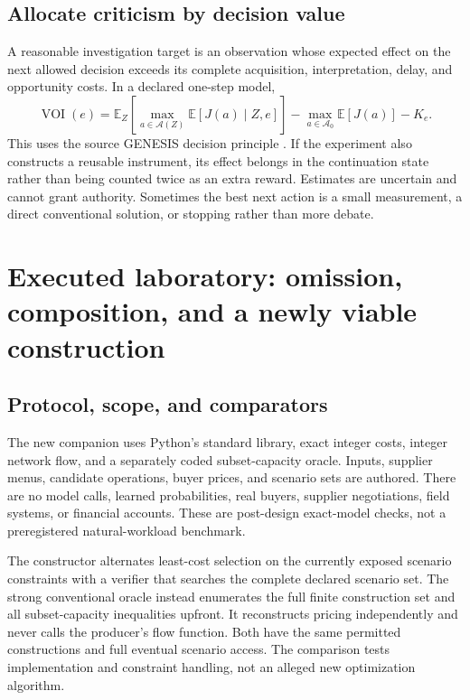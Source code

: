 \documentclass[11pt,a4paper]{article}
\newcommand{\E}{\mathbb{E}}
\begin{document}
\subsection{Allocate criticism by decision value}
A reasonable investigation target is an observation whose expected effect on the next allowed decision exceeds its complete acquisition, interpretation, delay, and opportunity costs. In a declared one-step model,
\begin{equation}
\operatorname{VOI}(e)=\E_Z\!\left[\max_{a\in\mathcal A(Z)}\E[J(a)\mid Z,e]\right]-\max_{a\in\mathcal A_0}\E[J(a)]-K_e.\label{eq:voi}
\end{equation}
This uses the source GENESIS decision principle \cite[Sec.~6.2]{genesis}. If the experiment also constructs a reusable instrument, its effect belongs in the continuation state rather than being counted twice as an extra reward. Estimates are uncertain and cannot grant authority. Sometimes the best next action is a small measurement, a direct conventional solution, or stopping rather than more debate.

\section{Executed laboratory: omission, composition, and a newly viable construction}
\subsection{Protocol, scope, and comparators}
The new companion uses Python's standard library, exact integer costs, integer network flow, and a separately coded subset-capacity oracle. Inputs, supplier menus, candidate operations, buyer prices, and scenario sets are authored. There are no model calls, learned probabilities, real buyers, supplier negotiations, field systems, or financial accounts. These are post-design exact-model checks, not a preregistered natural-workload benchmark.

The constructor alternates least-cost selection on the currently exposed scenario constraints with a verifier that searches the complete declared scenario set. The strong conventional oracle instead enumerates the full finite construction set and all subset-capacity inequalities upfront. It reconstructs pricing independently and never calls the producer's flow function. Both have the same permitted constructions and full eventual scenario access. The comparison tests implementation and constraint handling, not an alleged new optimization algorithm.
\end{document}
